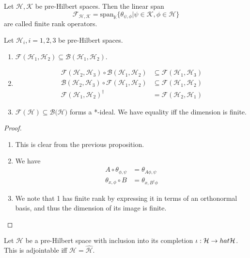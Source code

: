 \documentclass[twoside,symmetric, openany, 12pt]{./tuftebook}
\theoremstyle{definition}
\theoremstyle{definition}
\theoremstyle{definition}
\newenvironment{parts}{\begin{enumerate}[label=(\alph*)]}{\end{enumerate}}
\begin{document}
\begin{Definition}
	Let $\mathcal{H}, \mathcal{K}$ be pre-Hilbert spaces. Then the linear span
	\[
		\mathcal{F}_{\mathcal{H}, \mathcal{K}} = \text{span}_\mathbb{K}\{\theta_{\psi, \phi}|\psi\in \mathcal{K}, \phi\in \mathcal{H}\} 
	\]
	are called finite rank operators.
\end{Definition}
\begin{Proposition}
	Let $\mathcal{H}_i, i=1,2,3$ be pre-Hilbert spaces. 
	\begin{parts}
	\item $\mathcal{F}(\mathcal{H}_1, \mathcal{H}_2)\subseteq \mathcal{B}(\mathcal{H}_1, \mathcal{H}_2)$.
	\item 
		\begin{align*}
			\mathcal{F}(\mathcal{H}_2, \mathcal{H}_3) \circ \mathcal{B}(\mathcal{H}_1, \mathcal{H}_2)&\subseteq \mathcal{F}(\mathcal{H}_1, \mathcal{H}_3)\\
			\mathcal{B}(\mathcal{H}_2, \mathcal{H}_3) \circ \mathcal{F}(\mathcal{H}_1, \mathcal{H}_2)&\subseteq \mathcal{F}(\mathcal{H}_1, \mathcal{H}_2)\\
			\mathcal{F}(\mathcal{H}_1, \mathcal{H}_2)^\dagger &= \mathcal{F}(\mathcal{H}_2, \mathcal{H}_1)
		\end{align*}
	\item $\mathcal{F}(\mathcal{H})\subseteq  \mathcal{B}(\mathcal{H)}$ forms a *-ideal. We have equality iff the dimension is finite.
	\end{parts}
\end{Proposition}
\begin{proof}
	\begin{parts}
	\item This is clear from the previous proposition.
	\item We have
		\begin{align*}
			A\circ \theta_{\phi, \psi}&=\theta_{A\phi, \psi}\\
			\theta_{x, \phi}\circ B&=\theta_{x, B^\dagger \phi}
		\end{align*}
	\item We note that 1 has finite rank by expressing it in terms of an orthonormal basis, and thus the dimension of its image is finite.\qedhere
	\end{parts}
\end{proof}
\begin{Example}
Let $\mathcal{H}$ be a pre-Hilbert space with inclusion into its completion $\iota:\mathcal{H}\to \\hat{\mathcal{H}}$. This is adjointable iff $\mathcal{H}=\hat{\mathcal{H}}$.
\end{Example}
\end{document}

